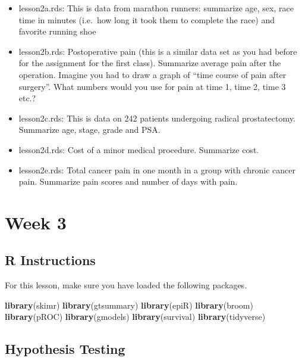 \documentclass[]{book}
\newenvironment{Shaded}{\begin{snugshade}}{\end{snugshade}}
\newcommand{\KeywordTok}[1]{\textcolor[rgb]{0.13,0.29,0.53}{\textbf{#1}}}
\newcommand{\NormalTok}[1]{#1}
\providecommand{\tightlist}{%
  \setlength{\itemsep}{0pt}\setlength{\parskip}{0pt}}
\begin{document}
\begin{itemize}
\tightlist
\item
  lesson2a.rds: This is data from marathon runners: summarize age, sex,
  race time in minutes (i.e.~how long it took them to complete the race)
  and favorite running shoe
\item
  lesson2b.rds: Postoperative pain (this is a similar data set as you
  had before for the assignment for the first class). Summarize average
  pain after the operation. Imagine you had to draw a graph of ``time
  course of pain after surgery''. What numbers would you use for pain at
  time 1, time 2, time 3 etc.?
\item
  lesson2c.rds: This is data on 242 patients undergoing radical
  prostatectomy. Summarize age, stage, grade and PSA.
\item
  lesson2d.rds: Cost of a minor medical procedure. Summarize cost.
\item
  lesson2e.rds: Total cancer pain in one month in a group with chronic
  cancer pain. Summarize pain scores and number of days with pain.
\end{itemize}

\hypertarget{week-3}{%
\chapter{Week 3}\label{week-3}}

\hypertarget{r-instructions-2}{%
\section{R Instructions}\label{r-instructions-2}}

For this lesson, make sure you have loaded the following packages.

\begin{Shaded}
\begin{Highlighting}[]
\KeywordTok{library}\NormalTok{(skimr)}
\KeywordTok{library}\NormalTok{(gtsummary)}
\KeywordTok{library}\NormalTok{(epiR)}
\KeywordTok{library}\NormalTok{(broom)}
\KeywordTok{library}\NormalTok{(pROC)}
\KeywordTok{library}\NormalTok{(gmodels)}
\KeywordTok{library}\NormalTok{(survival)}
\KeywordTok{library}\NormalTok{(tidyverse)}
\end{Highlighting}
\end{Shaded}

\hypertarget{hypothesis-testing}{%
\section{Hypothesis Testing}\label{hypothesis-testing}}
\end{document}
